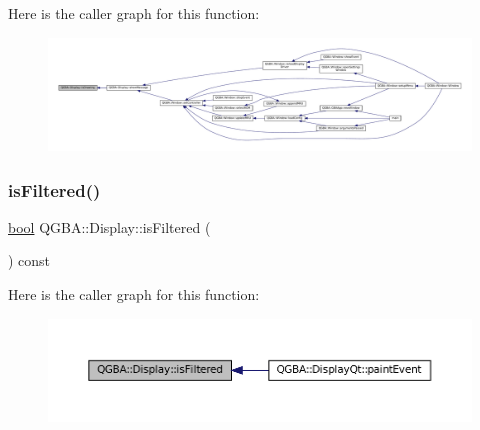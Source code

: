 Here is the caller graph for this function\+:
\nopagebreak
\begin{figure}[H]
\begin{center}
\leavevmode
\includegraphics[width=350pt]{class_q_g_b_a_1_1_display_ace6799f5c31d1736c92033b2cf4daa31_icgraph}
\end{center}
\end{figure}
\mbox{\label{class_q_g_b_a_1_1_display_a412ea3446aa7d96262999511ffb176eb}} 
\subsubsection{\texorpdfstring{is\+Filtered()}{isFiltered()}}
{\footnotesize\ttfamily \mbox{\hyperlink{libretro_8h_a4a26dcae73fb7e1528214a068aca317e}{bool}} Q\+G\+B\+A\+::\+Display\+::is\+Filtered (\begin{DoxyParamCaption}{ }\end{DoxyParamCaption}) const\hspace{0.3cm}{\ttfamily [inline]}}

Here is the caller graph for this function\+:
\nopagebreak
\begin{figure}[H]
\begin{center}
\leavevmode
\includegraphics[width=350pt]{class_q_g_b_a_1_1_display_a412ea3446aa7d96262999511ffb176eb_icgraph}
\end{center}
\end{figure}
\mbox{\label{class_q_g_b_a_1_1_display_a91092d6e566e11d38500912c09429ae2}} 
